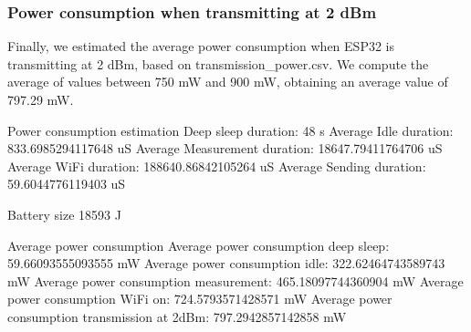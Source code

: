\subsubsection{Power consumption when transmitting at 2 dBm}
Finally, we estimated the average power consumption when ESP32 is transmitting at 2 dBm, based on transmission\_power.csv. We compute the average of values between 750 mW and 900 mW, obtaining an average value of 797.29 mW.


Power consumption estimation
Deep sleep duration: 48 s
Average Idle duration: 833.6985294117648 uS
Average Measurement duration: 18647.79411764706 uS
Average WiFi duration: 188640.86842105264 uS
Average Sending duration: 59.6044776119403 uS

Battery size
18593 J

Average power consumption 
Average power consumption deep sleep:  59.66093555093555 mW
Average power consumption idle:  322.62464743589743 mW
Average power consumption measurement:  465.18097744360904 mW
Average power consumption WiFi on:  724.5793571428571 mW
Average power consumption transmission at 2dBm:  797.2942857142858 mW
